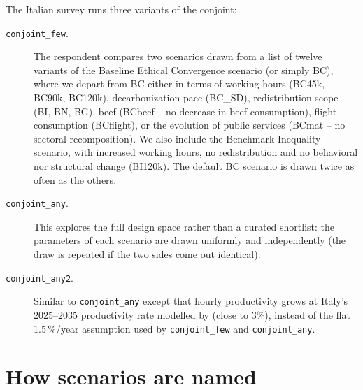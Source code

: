 \documentclass[12pt,a4paper]{article}
\newcommand{\file}[1]{\texttt{#1}}
\begin{document}
The Italian survey runs three variants of the conjoint: %

\begin{description}
  \item[\file{conjoint\_few}.] The respondent compares two scenarios drawn from a list of twelve variants of the Baseline Ethical Convergence scenario (or simply BC), where we depart from BC either in terms of working hours (BC45k, BC90k, BC120k), decarbonization pace (BC\_SD), redistribution scope (BI, BN, BG), beef (BCbeef -- no decrease in beef consumption), flight consumption (BCflight), or the evolution of public services (BCmat -- no sectoral recomposition). We also include the Benchmark Inequality scenario, with increased working hours, no redistribution and no behavioral nor structural change (BI120k). The default BC scenario is drawn twice as often as the others.

  \item[\file{conjoint\_any}.] This explores the full design space rather than a curated shortlist: the parameters of each scenario are drawn uniformly and independently (the draw is repeated if the two sides come out identical). 

  \item[\file{conjoint\_any2}.] Similar to \file{conjoint\_any} except that hourly productivity grows at Italy's  2025--2035 productivity rate modelled by \cite{Chancel2026} (close to 3\%), instead of the flat 1.5\,\%/year assumption used by \file{conjoint\_few} and \file{conjoint\_any}.
\end{description}


\section{How scenarios are named}
\label{sec:naming}
\end{document}
